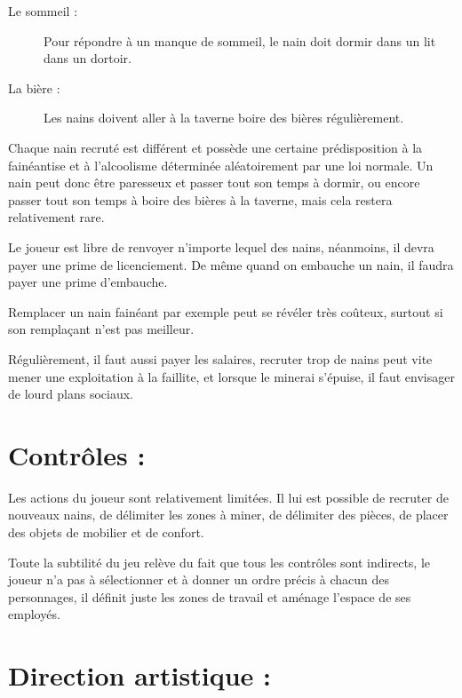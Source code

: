 \documentclass[a4paper]{report}
\begin{document}
\begin{description}
\item[Le sommeil :]Pour répondre à un manque de sommeil, le nain doit dormir dans un lit dans un dortoir.
\item[La bière :] Les nains doivent aller à la taverne boire des bières régulièrement.
\end{description}

Chaque nain recruté est différent et possède une certaine prédisposition à la fainéantise et à l'alcoolisme déterminée aléatoirement par une loi normale. Un nain peut donc être paresseux et passer tout son temps à dormir, ou encore passer tout son temps à boire des bières à la taverne, mais cela restera relativement rare.

\vspace{0.2cm}
\vspace{0.2cm}

Le joueur est libre de renvoyer n'importe lequel des nains, néanmoins, il devra payer une prime de licenciement. De même quand on embauche un nain, il faudra payer une prime d'embauche. 

Remplacer un nain fainéant par exemple peut se révéler très coûteux, surtout si son remplaçant n'est pas meilleur.

Régulièrement, il faut aussi payer les salaires, recruter trop de nains peut vite mener une exploitation à la faillite, et lorsque le minerai s’épuise, il faut envisager de lourd plans sociaux.

\chapter*{Contrôles :}

Les actions du joueur sont relativement limitées. Il lui est possible de recruter de nouveaux nains, de délimiter les zones à miner, de délimiter des pièces, de placer des objets de mobilier et de confort.

Toute la subtilité du jeu relève du fait que tous les contrôles sont indirects, le joueur n'a pas à sélectionner et à donner un ordre précis à chacun des personnages, il définit juste les zones de travail et aménage l'espace de ses employés.


\newpage
\chapter*{Direction artistique :}
\end{document}

